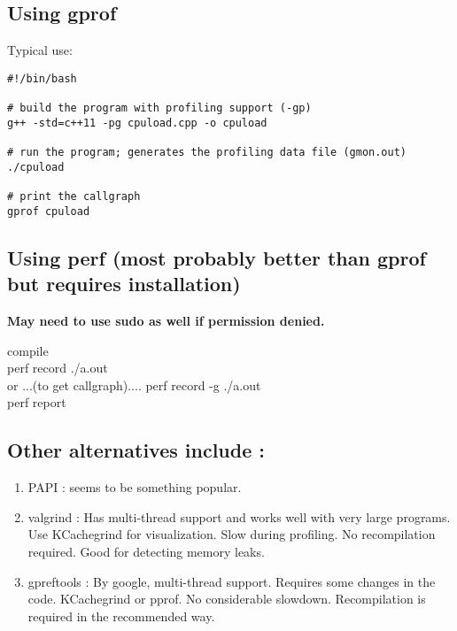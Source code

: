 \noindent



\subsection{Using gprof}

Typical use:\\


\begin{lstlisting}
#!/bin/bash

# build the program with profiling support (-gp)
g++ -std=c++11 -pg cpuload.cpp -o cpuload

# run the program; generates the profiling data file (gmon.out)
./cpuload

# print the callgraph
gprof cpuload

\end{lstlisting}


\subsection{Using perf (most probably better than gprof but requires installation)}
\textbf{May need to use sudo as well if permission denied.}

compile \\
perf record ./a.out\\
or ...(to get callgraph).... perf record -g ./a.out\\
perf report




\subsection{Other alternatives include :}


\begin{enumerate}
    \item PAPI : seems to be something popular.
    \item valgrind : Has multi-thread support and works well with very large programs. Use KCachegrind for visualization. Slow during profiling. No recompilation required. Good for detecting memory leaks.
    \item gpreftools : By google, multi-thread support. Requires some changes in the code. KCachegrind or pprof. No considerable slowdown. Recompilation is required in the recommended way.
\end{enumerate}